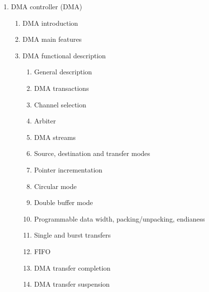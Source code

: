 \documentclass{article}
\begin{document}
\begin{enumerate}
\begin{enumerate}
\begin{enumerate}
            \item GPIO port output data register (GPIOx\_ODR) (x = A..E and H) 
            \item GPIO port bit set/reset register (GPIOx\_BSRR) (x = A..E and H) 
            \item GPIO port configuration lock register (GPIOx\_LCKR) (x = A..E and H) 
            \item GPIO alternate function low register (GPIOx\_AFRL) (x = A..E and H) 
            \item GPIO alternate function high register (GPIOx\_AFRH) (x = A..E and H) 
            \item GPIO register map 
        \end{enumerate}
    \end{enumerate}
    \item DMA controller (DMA) 
    \begin{enumerate}
        \item DMA introduction 
        \item DMA main features 
        \item DMA functional description 
        \begin{enumerate}
            \item General description 
            \item DMA transactions 
            \item Channel selection 
            \item Arbiter 
            \item DMA streams 
            \item Source, destination and transfer modes 
            \item Pointer incrementation 
            \item Circular mode 
            \item Double buffer mode 
            \item Programmable data width, packing/unpacking, endianess 
            \item Single and burst transfers 
            \item FIFO 
            \item DMA transfer completion 
            \item DMA transfer suspension 

\end{enumerate}
\end{enumerate}
\end{enumerate}
\end{document}
